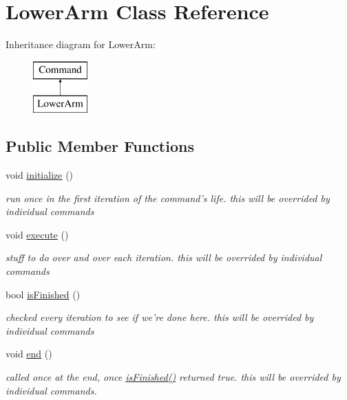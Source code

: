 \hypertarget{classLowerArm}{\section{Lower\-Arm Class Reference}
\label{classLowerArm}
}
Inheritance diagram for Lower\-Arm\-:\begin{figure}[H]
\begin{center}
\leavevmode
\includegraphics[height=2.000000cm]{classLowerArm}
\end{center}
\end{figure}
\subsection*{Public Member Functions}
\begin{DoxyCompactItemize}
\item 
\hypertarget{classLowerArm_a4fe99e8f0cdb3526e3847823f69a60b8}{void \hyperlink{classLowerArm_a4fe99e8f0cdb3526e3847823f69a60b8}{initialize} ()}\label{classLowerArm_a4fe99e8f0cdb3526e3847823f69a60b8}

\begin{DoxyCompactList}\small\item\em run once in the first iteration of the command's life. this will be overrided by individual commands \end{DoxyCompactList}\item 
\hypertarget{classLowerArm_aca65c2ae64b1ff601213b1ed38ddf8b0}{void \hyperlink{classLowerArm_aca65c2ae64b1ff601213b1ed38ddf8b0}{execute} ()}\label{classLowerArm_aca65c2ae64b1ff601213b1ed38ddf8b0}

\begin{DoxyCompactList}\small\item\em stuff to do over and over each iteration. this will be overrided by individual commands \end{DoxyCompactList}\item 
bool \hyperlink{classLowerArm_ad7bb0aadf698f341d737ccefdb015ce2}{is\-Finished} ()
\begin{DoxyCompactList}\small\item\em checked every iteration to see if we're done here. this will be overrided by individual commands \end{DoxyCompactList}\item 
\hypertarget{classLowerArm_aa46179794b13132a2a353f24c785db37}{void \hyperlink{classLowerArm_aa46179794b13132a2a353f24c785db37}{end} ()}\label{classLowerArm_aa46179794b13132a2a353f24c785db37}

\begin{DoxyCompactList}\small\item\em called once at the end, once \hyperlink{classLowerArm_ad7bb0aadf698f341d737ccefdb015ce2}{is\-Finished()} returned true. this will be overrided by individual commands. \end{DoxyCompactList}\end{DoxyCompactItemize}
